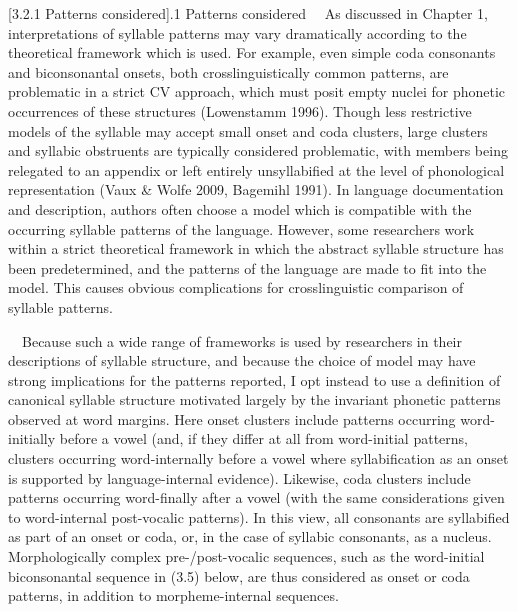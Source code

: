 \documentclass[12pt]{article}
\makeatletter
\renewcommand\section{\@startsection{section}{1}{0.0in}{0in}{0.1mm}{\normalfont\normalsize\fontsize{18pt}{21.6pt}\selectfont\rmfamily\bfseries\upshape\raggedright}}
\newenvironment{styleBody}{\renewcommand\baselinestretch{1.0}\setlength\leftskip{0in}\setlength\rightskip{0in plus 1fil}\setlength\parindent{0in}\setlength\parfillskip{0pt plus 1fil}\setlength\parskip{0in plus 1pt}\writerlistparindent\writerlistleftskip\leavevmode\normalfont\normalsize\fontsize{11pt}{13.2pt}\selectfont\mdseries\upshape\writerlistlabel\ignorespaces}{\unskip\vspace{0in plus 1pt}\par}
\newcommand\writerlistleftskip{}
\newcommand\writerlistparindent{}
\newcommand\writerlistlabel{}
\makeatother
\begin{document}
\section[3.2.1 Patterns considered]{.1 Patterns considered}
\begin{styleBody}
\ \ As discussed in Chapter 1, interpretations of syllable patterns may vary dramatically according to the theoretical framework which is used. For example, even simple coda consonants and biconsonantal onsets, both crosslinguistically common patterns, are problematic in a strict CV approach, which must posit empty nuclei for phonetic occurrences of these structures (Lowenstamm 1996). Though less restrictive models of the syllable may accept small onset and coda clusters, large clusters and syllabic obstruents are typically considered problematic, with members being relegated to an appendix or left entirely unsyllabified at the level of phonological representation (Vaux \& Wolfe 2009, Bagemihl 1991). In language documentation and description, authors often choose a model which is compatible with the occurring syllable patterns of the language. However, some researchers work within a strict theoretical framework in which the abstract syllable structure has been predetermined, and the patterns of the language are made to fit into the model. This causes obvious complications for crosslinguistic comparison of syllable patterns.
\end{styleBody}

\begin{styleBody}
\ \ Because such a wide range of frameworks is used by researchers in their descriptions of syllable structure, and because the choice of model may have strong implications for the patterns reported, I opt instead to use a definition of canonical syllable structure motivated largely by the invariant phonetic patterns observed at word margins. Here onset clusters include patterns occurring word-initially before a vowel (and, if they differ at all from word-initial patterns, clusters occurring word-internally before a vowel where syllabification as an onset is supported by language-internal evidence). Likewise, coda clusters include patterns occurring word-finally after a vowel (with the same considerations given to word-internal post-vocalic patterns). In this view, all consonants are syllabified as part of an onset or coda, or, in the case of syllabic consonants, as a nucleus. Morphologically complex pre-/post-vocalic sequences, such as the word-initial biconsonantal sequence in (3.5) below, are thus considered as onset or coda patterns, in addition to morpheme-internal sequences.
\end{styleBody}
\end{document}
